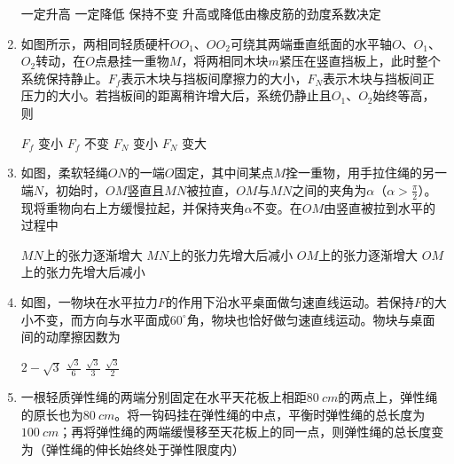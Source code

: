 \begin{enumerate}
\fourchoices
{一定升高}
{一定降低}
{保持不变}
{升高或降低由橡皮筋的劲度系数决定}



\item 
{}
如图所示，两相同轻质硬杆$ OO_{1} $、$ OO_{2} $可绕其两端垂直纸面的水平轴$ O $、$ O_{1} $、$ O_{2} $转动，在$ O $点悬挂一重物$ M $，将两相同木块$ m $紧压在竖直挡板上，此时整个系统保持静止。$ F_f $表示木块与挡板间摩擦力的大小，$ F_{N} $表示木块与挡板间正压力的大小。若挡板间的距离稍许增大后，系统仍静止且$ O_{1} $、$ O_{2} $始终等高，则  
\begin{figure}[h!]
\centering

\end{figure}

\fourchoices
{$ F_f $ 变小}
{$ F_f $ 不变}
{$ F_{N} $ 变小}
{$ F_{N} $ 变大}


\item 
{}
如图，柔软轻绳$ ON $的一端$ O $固定，其中间某点$ M $拴一重物，用手拉住绳的另一端$ N $，初始时，$ OM $竖直且$ MN $被拉直，$ OM $与$ MN $之间的夹角为$ \alpha $（$ \alpha
>\frac{\pi}{2} $）。现将重物向右上方缓慢拉起，并保持夹角$ \alpha
$不变。在$ OM $由竖直被拉到水平的过程中  
\begin{figure}[h!]
\centering

\end{figure}


\fourchoices
{$ MN $上的张力逐渐增大}
{$ MN $上的张力先增大后减小}
{$ OM $上的张力逐渐增大}
{$ OM $上的张力先增大后减小}


\item 
{}
如图，一物块在水平拉力$ F $的作用下沿水平桌面做匀速直线运动。若保持$ F $的大小不变，而方向与水平面成$ 60 ^{ \circ } $角，物块也恰好做匀速直线运动。物块与桌面间的动摩擦因数为  
\begin{figure}[h!]
\centering

\end{figure}

\fourchoices
{$ 2 - \sqrt { 3 } $}
{$ \frac { \sqrt { 3 } } { 6 } $}
{$ \frac { \sqrt { 3 } } { 3 } $}
{$ \frac { \sqrt { 3 } } { 2 } $}


\item 
{}
一根轻质弹性绳的两端分别固定在水平天花板上相距$ 80 \ cm $的两点上，弹性绳的原长也为$ 80 \ cm $。将一钩码挂在弹性绳的中点，平衡时弹性绳的总长度为$ 100 \ cm $；再将弹性绳的两端缓慢移至天花板上的同一点，则弹性绳的总长度变为（弹性绳的伸长始终处于弹性限度内）  



\end{enumerate}
